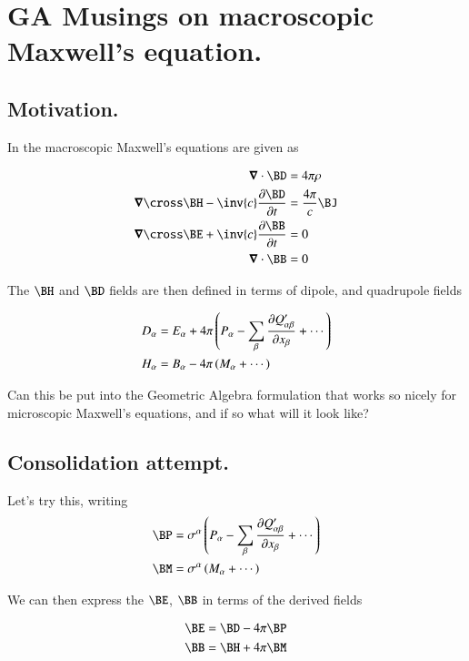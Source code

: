 \chapter{GA Musings on macroscopic Maxwell's equation.}

\section{Motivation. }

In \cite{jackson1975cew} the macroscopic Maxwell's equations are given as

\begin{align}\label{eqn:macroMax:MaxwellMixedFields}
\spacegrad \cdot \BD &= 4 \pi \rho \\
\spacegrad \cross \BH - \inv{c} \PD{t}{\BD} &= \frac{4 \pi}{c} \BJ \\
\spacegrad \cross \BE + \inv{c} \PD{t}{\BB} &= 0 \\
\spacegrad \cdot \BB &= 0
\end{align}

The $\BH$ and $\BD$ fields are then defined in terms of dipole, and quadrupole
fields

\begin{align}\label{eqn:macroMax:dipoleCoordinates}
D_\alpha &= E_\alpha + 4\pi \left( P_\alpha - \sum_\beta \PD{x_\beta}{Q'_{\alpha\beta}} + \cdots\right) \\
H_\alpha &= B_\alpha - 4\pi \left( M_\alpha + \cdots\right)
\end{align}

Can this be put into the Geometric Algebra formulation that works so
nicely for microscopic Maxwell's equations, and if so what will it look like?

\section{Consolidation attempt. }

Let's try this, writing
\begin{align}
\BP &= \sigma^\alpha \left( P_\alpha - \sum_\beta \PD{x_\beta}{Q'_{\alpha\beta}} + \cdots\right) \\
\BM &= \sigma^\alpha \left( M_\alpha + \cdots \right)
\end{align}

We can then express the $\BE$, $\BB$ in terms of the derived fields

\begin{align}
\BE &= \BD - 4\pi \BP \\
\BB &= \BH + 4\pi \BM
\end{align}

